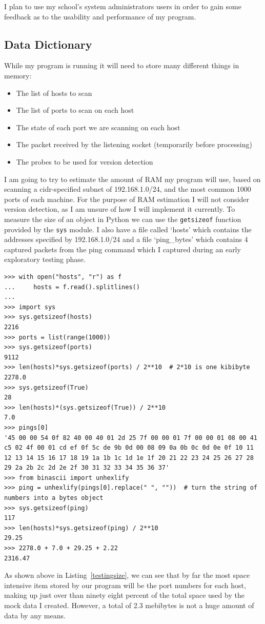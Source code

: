 \documentclass[titlepage]{article}
\let\Oldsubsection\subsection{}
\renewcommand{\subsection}{\FloatBarrier\Oldsubsection}
\begin{document}
I plan to use my school's system administrators users in order to gain some feedback
as to the usability and performance of my program.

\subsection{Data Dictionary}

While my program is running it will need to store many different things in memory:
\begin{itemize}
  \item{The list of hosts to scan}
  \item{The list of ports to scan on each host}
  \item{The state of each port we are scanning on each host}
  \item{The packet received by the listening socket (temporarily before processing)}
  \item{The probes to be used for version detection}
\end{itemize}
I am going to try to estimate the amount of RAM my program will use, based on scanning a 
\gls{cidr}-specified subnet of 192.168.1.0/24, and the most common 1000 ports of each machine.
For the purpose of RAM estimation I will not consider version detection, as I am unsure of how I will implement it currently.
To measure the size of an object in Python we can use the \verb|getsizeof| function provided by the
\verb|sys| module. I also have a file called `hosts' which contains the addresses specified by
192.168.1.0/24 and a file `ping\_bytes' which contains 4 captured packets from the ping command
which I captured during an early exploratory testing phase.
\lstset{language=Python}
\begin{lstlisting}[label=testingsize,caption=\textit{Some testing I did on the size of Python objects.}]
>>> with open("hosts", "r") as f
...     hosts = f.read().splitlines()
... 
>>> import sys
>>> sys.getsizeof(hosts)
2216
>>> ports = list(range(1000))
>>> sys.getsizeof(ports)
9112
>>> len(hosts)*sys.getsizeof(ports) / 2**10  # 2*10 is one kibibyte
2278.0
>>> sys.getsizeof(True)
28
>>> len(hosts)*(sys.getsizeof(True)) / 2**10
7.0
>>> pings[0]
'45 00 00 54 0f 82 40 00 40 01 2d 25 7f 00 00 01 7f 00 00 01 08 00 41 c5 02 4f 00 01 cd ef 0f 5c de 9b 0d 00 08 09 0a 0b 0c 0d 0e 0f 10 11 12 13 14 15 16 17 18 19 1a 1b 1c 1d 1e 1f 20 21 22 23 24 25 26 27 28 29 2a 2b 2c 2d 2e 2f 30 31 32 33 34 35 36 37'
>>> from binascii import unhexlify
>>> ping = unhexlify(pings[0].replace(" ", ""))  # turn the string of numbers into a bytes object
>>> sys.getsizeof(ping)
117
>>> len(hosts)*sys.getsizeof(ping) / 2**10
29.25
>>> 2278.0 + 7.0 + 29.25 + 2.22
2316.47
\end{lstlisting}
As shown above in Listing~\ref{testingsize}, we can see that by far the most space intensive item stored
by our program will be the port numbers for each host, making up just over than ninety eight percent
of the total space used by the mock data I created. However, a total of 2.3 mebibytes is not a huge
amount of data by any means.
\end{document}
